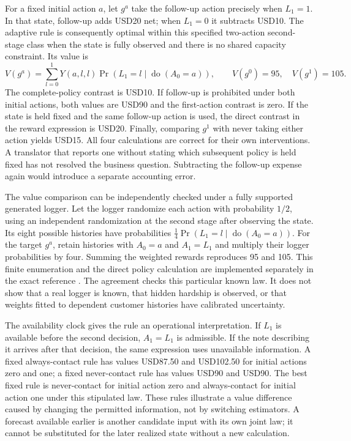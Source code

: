 For a fixed initial action $a$, let $g^a$ take the follow-up action precisely
when $L_1=1$. In that state, follow-up adds USD20 net; when $L_1=0$ it
subtracts USD10. The adaptive rule is consequently optimal within this
specified two-action second-stage class when the state is fully observed
and there is no shared capacity constraint. Its value is
\begin{equation}
 V(g^a)=\sum_{l=0}^1Y(a,l,l)\Pr(L_1=l\mid\operatorname{do}(A_0=a)),
 \qquad V(g^0)=95,\quad V(g^1)=105.
 \label{exec17:l2-sequential-value}
\end{equation}
The complete-policy contrast is USD10. If follow-up is prohibited under
both initial actions, both values are USD90 and the first-action contrast
is zero. If the state is held fixed and the same follow-up action is used,
the direct contrast in the reward expression is USD20. Finally, comparing
$g^1$ with never taking either action yields USD15. All four calculations
are correct for their own interventions. A translator that reports one
without stating which subsequent policy is held fixed has not resolved the
business question. Subtracting the follow-up expense again would introduce
a separate accounting error.

The value comparison can be independently checked under a fully supported
generated logger. Let the logger randomize each action with probability
$1/2$, using an independent randomization at the second stage after observing
the state. Its eight possible histories have probabilities
$\tfrac14\Pr(L_1=l\mid\operatorname{do}(A_0=a))$. For the target $g^a$,
retain histories with $A_0=a$ and $A_1=L_1$ and multiply their logger
probabilities by four. Summing the weighted rewards reproduces 95 and 105.
This finite enumeration and the direct policy calculation are implemented
separately in the exact reference \citep{exec17_l2_policy_exact}. The agreement
checks this particular known law. It does not show that a real logger is
known, that hidden hardship is observed, or that weights fitted to dependent
customer histories have calibrated uncertainty.

The availability clock gives the rule an operational interpretation. If
$L_1$ is available before the second decision, $A_1=L_1$ is admissible.
If the note describing it arrives after that decision, the same expression
uses unavailable information. A fixed always-contact rule has values
USD87.50 and USD102.50 for initial actions zero and one; a fixed never-contact
rule has values USD90 and USD90. The best fixed rule is never-contact for initial action zero and
always-contact for initial action one under this stipulated law. These rules
illustrate a value difference caused by changing the permitted information,
not by switching estimators. A forecast available earlier is another
candidate input with its own joint law; it cannot be substituted for the
later realized state without a new calculation.

